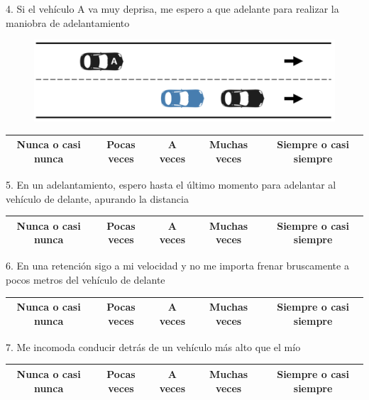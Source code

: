 4. Si el vehículo A va muy deprisa, me espero a que adelante para realizar la maniobra de adelantamiento
\begin{figure}[h]
    \centering
    \includegraphics[width=14cm]
    {figures/B1.png}
\end{figure}
\vspace{-10pt}
\begin{table}[h]
\centering
\begin{tabular}{|c|c|c|c|c|}
\hline
Nunca o casi nunca & Pocas veces & A veces & Muchas veces & Siempre o casi siempre \\ \hline
\end{tabular}
\end{table}

5. En un adelantamiento, espero hasta el último momento para adelantar al vehículo de delante, apurando la distancia  
\vspace{-10pt}
\begin{table}[h]
\centering
\begin{tabular}{|c|c|c|c|c|}
\hline
Nunca o casi nunca & Pocas veces & A veces & Muchas veces & Siempre o casi siempre \\ \hline
\end{tabular}
\end{table}

6. En una retención sigo a mi velocidad y no me importa frenar bruscamente a pocos metros del vehículo de delante 
\vspace{-10pt}
\begin{table}[H]
\centering
\begin{tabular}{|c|c|c|c|c|}
\hline
Nunca o casi nunca & Pocas veces & A veces & Muchas veces & Siempre o casi siempre \\ \hline
\end{tabular}
\end{table}

7. Me incomoda conducir detrás de un vehículo más alto que el mío
\vspace{-10pt}
\begin{table}[H]
\centering
\begin{tabular}{|c|c|c|c|c|}
\hline
Nunca o casi nunca & Pocas veces & A veces & Muchas veces & Siempre o casi siempre \\ \hline
\end{tabular}
\end{table}

